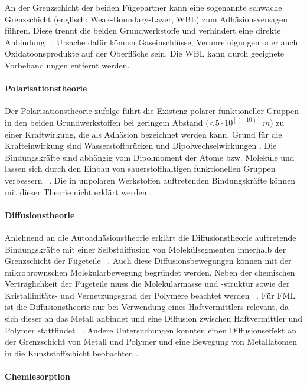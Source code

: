 An der Grenzschicht der beiden Fügepartner kann eine sogenannte schwache Grenzschicht (englisch: Weak-Boundary-Layer, WBL) zum Adhäsionsversagen führen.
Diese trennt die beiden Grundwerkstoffe und verhindert eine direkte Anbindung \cite{Schroer.1994}~.
Ursache dafür können Gaseinschlüsse, Verunreinigungen oder auch Oxidatoonsprodukte auf der Oberfläche sein.
Die WBL kann durch geeignete Vorbehandlungen entfernt werden. \cite{Flock.b}

\paragraph{Polarisationstheorie}

Der Polarisationstheorie zufolge führt die Existenz polarer funktioneller Gruppen in den beiden Grundwerkstoffen bei geringem Abstand (<$5\cdot10^[(-10)] \, m$) zu einer Kraftwirkung, die als Adhäsion bezeichnet werden kann.
Grund für die Krafteinwirkung sind Wasserstoffbrücken und Dipolwechselwirkungen \cite{Weiss.2002}.
Die Bindungskräfte sind abhängig vom Dipolmoment der Atome bzw. Moleküle und lassen sich durch den Einbau von sauerstoffhaltigen funktionellen Gruppen verbessern \cite{Garbassi.1998}~.
Die in unpolaren Werkstoffen auftretenden Bindungskräfte können mit dieser Theorie nicht erklärt werden \cite{Habenicht.2009}.

\paragraph{Diffusionstheorie}

Anlehnend an die Autoadhäsionstheorie erklärt die Diffusionstheorie auftretende Bindungskräfte mit einer Selbstdiffusion von Molekülsegmenten innerhalb der Grenzschicht der Fügeteile \cite{Gromov.1963}~.
Auch diese Diffusionsbewegungen können mit der mikrobrownschen Molekularbewegung begründet werden.
Neben der chemischen Verträglichkeit der Fügeteile muss die Molekularmasse und -struktur sowie der Kristallinitäts- und Vernetzungsgrad der Polymere beachtet werden \cite{Habenicht.2009}~.
Für FML ist die Diffusionstheorie nur bei Verwendung eines Haftvermittlers relevant,  da sich dieser an das Metall anbindet und eine Diffusion zwischen Haftvermittler und Polymer stattfindet \cite{Suchentrunk.2007}~.
Andere Untersuchungen konnten einen Diffusionseffekt an der Grenzschicht von Metall und Polymer und eine Bewegung von Metallatomen in die Kunststoffschicht beobachten \cite{Faupel.2003}.

\paragraph{Chemiesorption}

